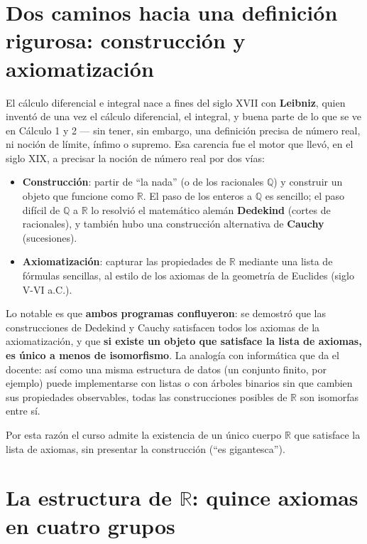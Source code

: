 \documentclass[12pt,a4paper]{article}
\begin{document}
\section{Dos caminos hacia una definición rigurosa: construcción y axiomatización}

El cálculo diferencial e integral nace a fines del siglo XVII con
\textbf{Leibniz}, quien inventó de una vez el cálculo diferencial, el
integral, y buena parte de lo que se ve en Cálculo 1 y 2 --- sin tener, sin
embargo, una definición precisa de número real, ni noción de límite, ínfimo
o supremo. Esa carencia fue el motor que llevó, en el siglo XIX, a precisar
la noción de número real por dos vías:

\begin{itemize}
  \item \textbf{Construcción}: partir de ``la nada'' (o de los racionales
    $\mathbb{Q}$) y construir un objeto que funcione como $\mathbb{R}$. El
    paso de los enteros a $\mathbb{Q}$ es sencillo; el paso difícil de
    $\mathbb{Q}$ a $\mathbb{R}$ lo resolvió el matemático alemán
    \textbf{Dedekind} (cortes de racionales), y también hubo una
    construcción alternativa de \textbf{Cauchy} (sucesiones).
  \item \textbf{Axiomatización}: capturar las propiedades de $\mathbb{R}$
    mediante una lista de fórmulas sencillas, al estilo de los axiomas de la
    geometría de Euclides (siglo V-VI a.C.).
\end{itemize}

Lo notable es que \textbf{ambos programas confluyeron}: se demostró que las
construcciones de Dedekind y Cauchy satisfacen todos los axiomas de la
axiomatización, y que \textbf{si existe un objeto que satisface la lista de
axiomas, es único a menos de isomorfismo}. La analogía con informática que
da el docente: así como una misma estructura de datos (un conjunto finito,
por ejemplo) puede implementarse con listas o con árboles binarios sin que
cambien sus propiedades observables, todas las construcciones posibles de
$\mathbb{R}$ son isomorfas entre sí.

\begin{notebox}
Por esta razón el curso admite la existencia de un único cuerpo
$\mathbb{R}$ que satisface la lista de axiomas, sin presentar la
construcción (``es gigantesca'').
\end{notebox}

\section{La estructura de $\mathbb{R}$: quince axiomas en cuatro grupos}
\end{document}
